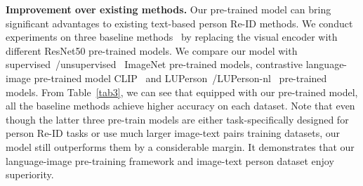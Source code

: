 \documentclass[10pt,twocolumn,letterpaper]{article}
\begin{document}
\noindent\textbf{Improvement over existing methods.} Our pre-trained model can bring significant advantages to existing text-based person Re-ID methods. We conduct experiments on three baseline methods~\cite{CMPM,SSAN,LGUR} by replacing the visual encoder with different ResNet50 pre-trained models. We compare our model with supervised~\cite{resnet}/unsupervised~\cite{mocov2} ImageNet pre-trained models, contrastive language-image pre-trained model CLIP~\cite{CLIP} and LUPerson~\cite{LUP}/LUPerson-nl~\cite{LUPnl} pre-trained models. From Table~\ref{tab3}, we can see that equipped with our pre-trained model, all the baseline methods achieve higher accuracy on each dataset. Note that even though the latter three pre-train models are either task-specifically designed for person Re-ID tasks or use much larger image-text pairs training datasets, our model still outperforms them by a considerable margin. It demonstrates that our language-image pre-training framework and image-text person dataset enjoy superiority.

\begin{table}[t]
\centering
\caption{Comparison on three baseline methods by using different pre-trained models. All results are shown in Rank-1/Rank-10. : to ensure fairness, we replace the MobileNet and LSTM in CMPM/C with a ResNet50 and BERT. }
\label{tab3}
\end{table}
\end{document}
